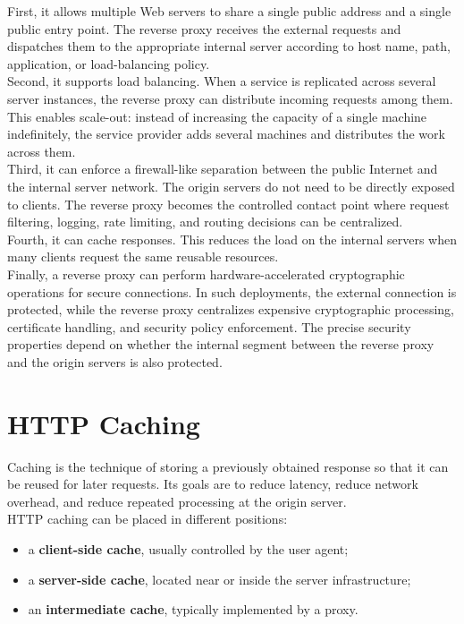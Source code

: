 \documentclass{scrbook}
\begin{document}
First, it allows multiple Web servers to share a single public address and a single public entry point. The reverse proxy receives the external requests and dispatches them to the appropriate internal server according to host name, path, application, or load-balancing policy.\\

Second, it supports load balancing. When a service is replicated across several server instances, the reverse proxy can distribute incoming requests among them. This enables scale-out: instead of increasing the capacity of a single machine indefinitely, the service provider adds several machines and distributes the work across them.\\

Third, it can enforce a firewall-like separation between the public Internet and the internal server network. The origin servers do not need to be directly exposed to clients. The reverse proxy becomes the controlled contact point where request filtering, logging, rate limiting, and routing decisions can be centralized.\\

Fourth, it can cache responses. This reduces the load on the internal servers when many clients request the same reusable resources.\\

Finally, a reverse proxy can perform hardware-accelerated cryptographic operations for secure connections. In such deployments, the external connection is protected, while the reverse proxy centralizes expensive cryptographic processing, certificate handling, and security policy enforcement. The precise security properties depend on whether the internal segment between the reverse proxy and the origin servers is also protected.

\section{HTTP Caching}

Caching is the technique of storing a previously obtained response so that it can be reused for later requests. Its goals are to reduce latency, reduce network overhead, and reduce repeated processing at the origin server.\\

HTTP caching can be placed in different positions:

\begin{itemize}
    \item a \textbf{client-side cache}, usually controlled by the user agent;
    \item a \textbf{server-side cache}, located near or inside the server infrastructure;
    \item an \textbf{intermediate cache}, typically implemented by a proxy.
\end{itemize}
\end{document}
